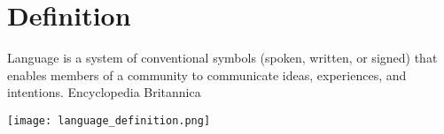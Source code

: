 




\tableofcontents
\cite{busoniu-2008-a-comprehensive-survey-of-multi-agent-reinforcement-learning}

\section{Definition}
    Language is a system of conventional symbols (spoken, written, or signed) that enables members of a community to communicate ideas, experiences, and intentions.
    Encyclopedia Britannica
    
    \texttt{[image: language\_definition.png]}


\listoftodos


